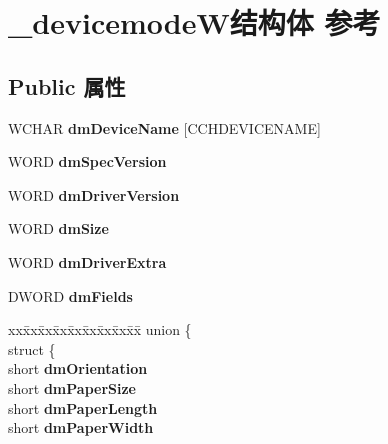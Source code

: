 \hypertarget{struct__devicemode_w}{}\section{\+\_\+devicemode\+W结构体 参考}
\label{struct__devicemode_w}
\subsection*{Public 属性}
\begin{DoxyCompactItemize}
\item 
\mbox{\label{struct__devicemode_w_a0f28627233271c14811e63c89614b62e}} 
W\+C\+H\+AR {\bfseries dm\+Device\+Name} \mbox{[}C\+C\+H\+D\+E\+V\+I\+C\+E\+N\+A\+ME\mbox{]}
\item 
\mbox{\label{struct__devicemode_w_a82c45d56545a36e661f773fde94257c0}} 
W\+O\+RD {\bfseries dm\+Spec\+Version}
\item 
\mbox{\label{struct__devicemode_w_aff3e2acb5ac9e4b8449878423e48ef98}} 
W\+O\+RD {\bfseries dm\+Driver\+Version}
\item 
\mbox{\label{struct__devicemode_w_af291ef2e8d6984b1499d73918cafeec1}} 
W\+O\+RD {\bfseries dm\+Size}
\item 
\mbox{\label{struct__devicemode_w_a6c15ec89f10b2563e39c64f7dab87c0f}} 
W\+O\+RD {\bfseries dm\+Driver\+Extra}
\item 
\mbox{\label{struct__devicemode_w_a33595ed0703acebd7a547d1ad0d4ae6e}} 
D\+W\+O\+RD {\bfseries dm\+Fields}
\item 
\mbox{\label{struct__devicemode_w_a23c78d0dabf516dcab2ef7097d117371}} 
\begin{tabbing}
xx\=xx\=xx\=xx\=xx\=xx\=xx\=xx\=xx\=\kill
union \{\\
\>struct \{\\
\>\>short {\bfseries dmOrientation}\\
\>\>short {\bfseries dmPaperSize}\\
\>\>short {\bfseries dmPaperLength}\\
\>\>short {\bfseries dmPaperWidth}\\

\end{tabbing}
\end{DoxyCompactItemize}
